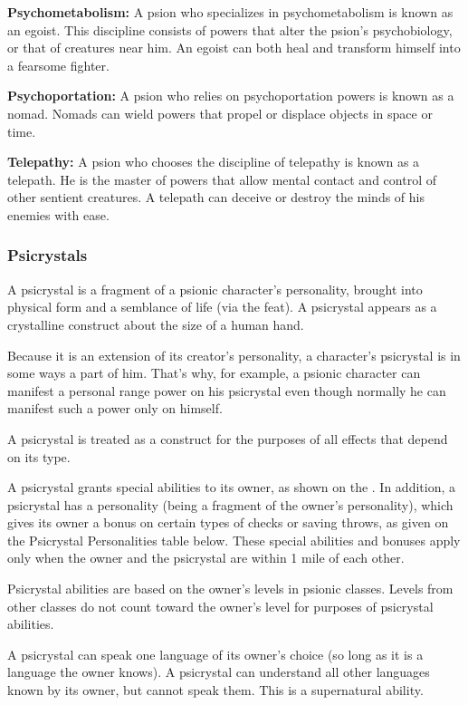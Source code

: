 \textbf{Psychometabolism:} A psion who specializes in psychometabolism is known as an egoist. This discipline consists of powers that alter the psion's psychobiology, or that of creatures near him. An egoist can both heal and transform himself into a fearsome fighter.

\textbf{Psychoportation:} A psion who relies on psychoportation powers is known as a nomad. Nomads can wield powers that propel or displace objects in space or time.

\textbf{Telepathy:} A psion who chooses the discipline of telepathy is known as a telepath. He is the master of powers that allow mental contact and control of other sentient creatures. A telepath can deceive or destroy the minds of his enemies with ease.

\subsubsection{Psicrystals}
A psicrystal is a fragment of a psionic character's personality, brought into physical form and a semblance of life (via the  feat). A psicrystal appears as a crystalline construct about the size of a human hand.

Because it is an extension of its creator's personality, a character's psicrystal is in some ways a part of him. That's why, for example, a psionic character can manifest a personal range power on his psicrystal even though normally he can manifest such a power only on himself.

A psicrystal is treated as a construct for the purposes of all effects that depend on its type.

A psicrystal grants special abilities to its owner, as shown on the . In addition, a psicrystal has a personality (being a fragment of the owner's personality), which gives its owner a bonus on certain types of checks or saving throws, as given on the Psicrystal Personalities table below. These special abilities and bonuses apply only when the owner and the psicrystal are within 1 mile of each other.

Psicrystal abilities are based on the owner's levels in psionic classes. Levels from other classes do not count toward the owner's level for purposes of psicrystal abilities.

A psicrystal can speak one language of its owner's choice (so long as it is a language the owner knows). A psicrystal can understand all other languages known by its owner, but cannot speak them. This is a supernatural ability.

